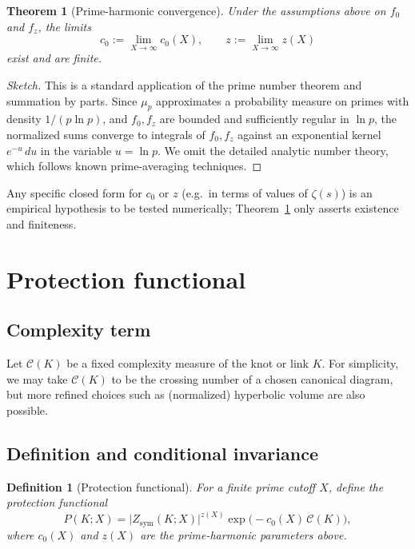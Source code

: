 \documentclass[11pt]{article}
\newtheorem{theorem}{Theorem}
\newtheorem{definition}{Definition}
\begin{document}
\begin{theorem}[Prime-harmonic convergence]
\label{thm:prime-limit}
Under the assumptions above on $f_0$ and $f_z$, the limits
\[
  c_0 := \lim_{X\to\infty} c_0(X),\qquad
  z   := \lim_{X\to\infty} z(X)
\]
exist and are finite.
\end{theorem}

\begin{proof}[Sketch]
This is a standard application of the prime number theorem and summation by parts.
Since $\mu_p$ approximates a probability measure on primes with density $1/(p\ln p)$, and $f_0,f_z$ are bounded and sufficiently regular in $\ln p$, the normalized sums converge to integrals of $f_0,f_z$ against an exponential kernel $e^{-u}\,du$ in the variable $u=\ln p$.
We omit the detailed analytic number theory, which follows known prime-averaging techniques.
\end{proof}

Any specific closed form for $c_0$ or $z$ (e.g.\ in terms of values of $\zeta(s)$) is an empirical hypothesis to be tested numerically; Theorem~\ref{thm:prime-limit} only asserts existence and finiteness.

\section{Protection functional}

\subsection{Complexity term}

Let $\mathcal C(K)$ be a fixed complexity measure of the knot or link $K$.
For simplicity, we may take $\mathcal C(K)$ to be the crossing number of a chosen canonical diagram, but more refined choices such as (normalized) hyperbolic volume are also possible.

\subsection{Definition and conditional invariance}

\begin{definition}[Protection functional]
For a finite prime cutoff $X$, define the protection functional
\[
  P(K;X) = \big|Z_{\mathrm{sym}}(K;X)\big|^{z(X)}\exp\big(-c_0(X)\,\mathcal C(K)\big),
\]
where $c_0(X)$ and $z(X)$ are the prime-harmonic parameters above.
\end{definition}
\end{document}

